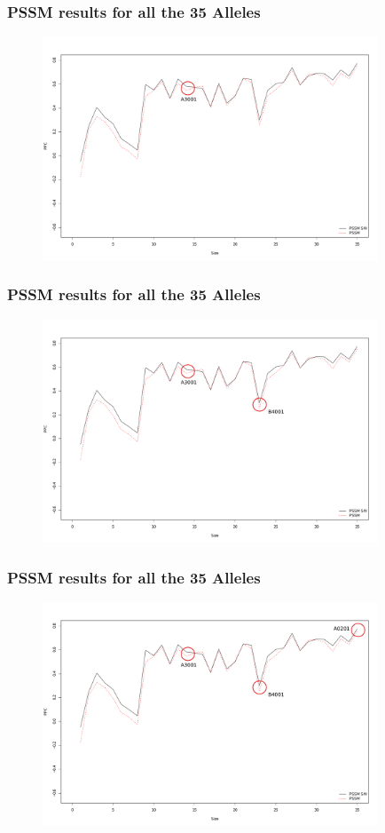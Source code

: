 \documentclass[presentation]{beamer}   %
\begin{document}
\begin{frame}
\frametitle{PSSM results for all the 35 Alleles}
 \begin{figure}[ht]
  \begin{center}
   \includegraphics[width=10cm]{fig/pssm_annot1.pdf}
  \end{center}
 \end{figure}
\end{frame}
\begin{frame}
\frametitle{PSSM results for all the 35 Alleles}
 \begin{figure}[ht]
  \begin{center}
   \includegraphics[width=10cm]{fig/pssm_annot2.pdf}
  \end{center}
 \end{figure}
\end{frame}
\begin{frame}
\frametitle{PSSM results for all the 35 Alleles}
 \begin{figure}[ht]
  \begin{center}
   \includegraphics[width=10cm]{fig/pssm_annot3.pdf}
  \end{center}
 \end{figure}
\end{frame}
\end{document}
